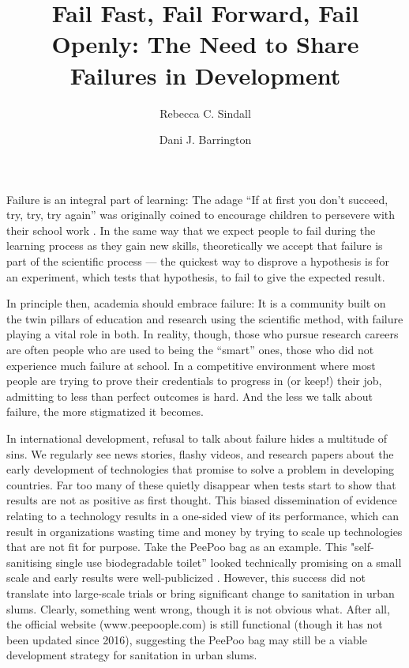 \documentclass[twocolumn, serif, authordate, editorial]{jote-article}
\title{Fail Fast, Fail Forward, Fail Openly: The Need to Share Failures in Development}
\author[1]{Rebecca C. Sindall}
\author[2]{Dani J. Barrington}
\affil[1]{Pollution Research Group, University of KwaZulu-Natal, Durban, South Africa}
\affil[2]{School of Population and Global Health, The University of Western Australia, Perth, Australia}
\begin{document}
\begin{frontmatter}
\maketitle
\setcounter{page}{6}

\end{frontmatter}
\noindent Failure is an integral part of learning: The adage “If at first you don’t succeed, try, try, try again” was originally coined to encourage children to persevere with their school work \parencite{Palmer1840}. In the same way that we expect people to fail during the learning process as they gain new skills, theoretically we accept that failure is part of the scientific process — the quickest way to disprove a hypothesis is for an experiment, which tests that hypothesis, to fail to give the expected result.

In principle then, academia should embrace failure: It is a community built on the twin pillars of education and research using the scientific method, with failure playing a vital role in both. In reality, though, those who pursue research careers are often people who are used to being the “smart” ones, those who did not experience much failure at school. In a competitive environment where most people are trying to prove their credentials to progress in (or keep!) their job, admitting to less than perfect outcomes is hard. And the less we talk about failure, the more stigmatized it becomes.

In international development, refusal to talk about failure hides a multitude of sins. We regularly see news stories, flashy videos, and research papers about the early development of technologies that promise to solve a problem in developing countries. Far too many of these quietly disappear when tests start to show that results are not as positive as first thought. This biased dissemination of evidence relating to a technology results in a one-sided view of its performance, which can result in organizations wasting time and money by trying to scale up technologies that are not fit for purpose. Take the PeePoo bag as an example. This "self-sanitising single use biodegradable toilet'' looked technically promising on a small scale \parencite{Vinnerås2009, Patel2011} and early results were well-publicized \parencite{Bhanoo2011, Ali2013}. However, this success did not translate into large-scale trials or bring significant change to sanitation in urban slums. Clearly, something went wrong, though it is not obvious what. After all, the official website (www.peepoople.com) is still functional (though it has not been updated since 2016), suggesting the PeePoo bag may still be a viable development strategy for sanitation in urban slums.
\end{document}
